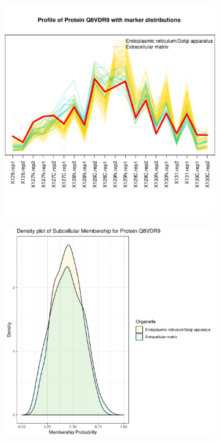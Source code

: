 \documentclass[12pt,english]{article}\usepackage[]{graphicx}\usepackage[]{color}
\makeatletter
\def\maxwidth{ %
  \ifdim\Gin@nat@width>\linewidth
    \linewidth
  \else
    \Gin@nat@width
  \fi
}
\newenvironment{knitrout}{}{} %
\makeatother
\begin{document}
\begin{figure}[h]
\begin{subfigure}[t]{0.5\textwidth}
\begin{knitrout}
{\centering \includegraphics[width=\maxwidth]{figure/Q8VDR9-prof-1} 

}



\end{knitrout}
    \caption{}
  \end{subfigure}
  \vspace{1cm}
  \begin{subfigure}[t]{0.5\textwidth}
    \centering
\begin{knitrout}
\color{fgcolor}

{\centering \includegraphics[width=\maxwidth]{figure/Q8VDR9-dens-1} 

}
\end{knitrout}
\end{subfigure}
\end{figure}
\end{document}
